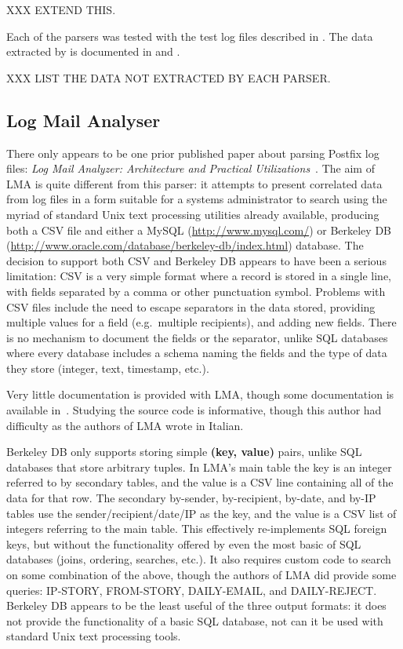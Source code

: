 XXX EXTEND THIS\@.

Each of the parsers was tested with the \numberOFlogFILES{} test log files
described in .  The data extracted by
\parsername{} is documented in  and
.

XXX LIST THE DATA NOT EXTRACTED BY EACH PARSER\@.

\subsection{Log Mail Analyser}

\label{prior art}

There only appears to be one prior published paper about parsing Postfix
log files: \textit{Log Mail Analyzer: Architecture and Practical
Utilizations\/}~\cite{log-mail-analyser}.  The aim of \gls{LMA} is quite
different from this parser: it attempts to present correlated data from log
files in a form suitable for a systems administrator to search using the
myriad of standard Unix text processing utilities already available,
producing both a \gls{CSV} file and either a MySQL
(\url{http://www.mysql.com/}) or Berkeley DB
(\url{http://www.oracle.com/database/berkeley-db/index.html}) database.
The decision to support both \gls{CSV} and Berkeley DB appears to have been
a serious limitation: \gls{CSV} is a very simple format where a record is
stored in a single line, with fields separated by a comma or other
punctuation symbol.  Problems with \gls{CSV} files include the need to
escape separators in the data stored, providing multiple values for a field
(e.g.\ multiple recipients), and adding new fields.  There is no mechanism
to document the fields or the separator, unlike \gls{SQL} databases where
every database includes a schema naming the fields and the type of data
they store (integer, text, timestamp, etc.).

Very little documentation is provided with \gls{LMA}, though some
documentation is available in~\cite{log-mail-analyser}.  Studying the
source code is informative, though this author had difficulty as the
authors of \gls{LMA} wrote in Italian.

Berkeley DB only supports storing simple \textbf{(key, value)} pairs,
unlike \gls{SQL} databases that store arbitrary tuples.  In \gls{LMA}'s
main table the key is an integer referred to by secondary tables, and the
value is a \gls{CSV} line containing all of the data for that row.  The
secondary by-sender, by-recipient, by-date, and by-\gls{IP} tables use the
sender/recipient/date/\gls{IP} as the key, and the value is a \gls{CSV}
list of integers referring to the main table.  This effectively
re-implements \gls{SQL} foreign keys, but without the functionality offered
by even the most basic of \gls{SQL} databases (joins, ordering, searches,
etc.).  It also requires custom code to search on some combination of the
above, though the authors of \gls{LMA} did provide some queries: IP-STORY,
FROM-STORY, DAILY-EMAIL, and DAILY-REJECT\@.  Berkeley DB appears to be the
least useful of the three output formats: it does not provide the
functionality of a basic \gls{SQL} database, not can it be used with
standard Unix text processing tools.

